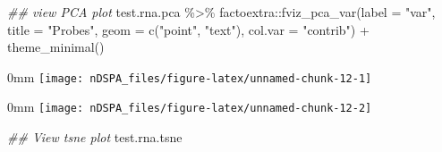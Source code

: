 \documentclass[]{article}
\newcommand{\hlnum}[1]{\textcolor[rgb]{0.816,0.125,0.439}{#1}}%
\newcommand{\hlstr}[1]{\textcolor[rgb]{0.251,0.627,0.251}{#1}}%
\newcommand{\hlcom}[1]{\textcolor[rgb]{0.502,0.502,0.502}{\textit{#1}}}%
\newcommand{\hlstd}[1]{\textcolor[rgb]{0.251,0.251,0.251}{#1}}%
\newenvironment{Shaded}{\begin{myshaded}}{\end{myshaded}}
\newcommand{\FloatTok}[1]{\hlnum{#1}}
\newcommand{\ConstantTok}[1]{\hlnum{#1}}
\newcommand{\SpecialCharTok}[1]{\hlstr{#1}}
\newcommand{\StringTok}[1]{\hlstr{#1}}
\newcommand{\DocumentationTok}[1]{\hlcom{#1}}
\newcommand{\FunctionTok}[1]{\hlstd{#1}}
\newcommand{\AttributeTok}[1]{{#1}}
\newcommand{\NormalTok}[1]{\hlstd{#1}}
\begin{document}
\begin{Shaded}
\begin{Highlighting}[]
\DocumentationTok{\#\# view PCA plot}
\NormalTok{test.rna.pca }\SpecialCharTok{\%\textgreater{}\%}\NormalTok{ factoextra}\SpecialCharTok{::}\FunctionTok{fviz\_pca\_var}\NormalTok{(}\AttributeTok{label =} \StringTok{"var"}\NormalTok{, }\AttributeTok{title =} \StringTok{"Probes"}\NormalTok{, }
    \AttributeTok{geom =} \FunctionTok{c}\NormalTok{(}\StringTok{"point"}\NormalTok{, }\StringTok{"text"}\NormalTok{), }\AttributeTok{col.var =} \StringTok{"contrib"}\NormalTok{) }\SpecialCharTok{+} \FunctionTok{theme\_minimal}\NormalTok{()}
\end{Highlighting}
\end{Shaded}

\begin{adjustwidth}{\fltoffset}{0mm}
\texttt{[image: nDSPA\_files/figure-latex/unnamed-chunk-12-1]} \end{adjustwidth}

\begin{Shaded}
\end{Shaded}

\begin{adjustwidth}{\fltoffset}{0mm}
\texttt{[image: nDSPA\_files/figure-latex/unnamed-chunk-12-2]} \end{adjustwidth}

\begin{Shaded}
\begin{Highlighting}[]

\DocumentationTok{\#\# View tsne plot}
\NormalTok{test.rna.tsne}
\end{Highlighting}
\end{Shaded}
\end{document}
